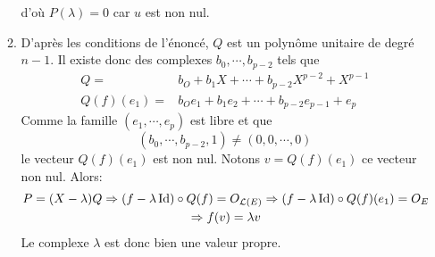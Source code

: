 \begin{enumerate}
\begin{enumerate}
d'où $P(\lambda)=0$ car $u$ est non nul.
\item D'après les conditions de l'énoncé, $Q$ est un polynôme unitaire de degré $n-1$. Il existe donc des complexes $b_0,\cdots, b_{p-2}$ tels que
\begin{align*}
 Q =& b_O + b_1 X + \cdots +b_{p-2}X^{p-2}+X^{p-1}\\
Q(f)(e_1) =& b_Oe_1 + b_1 e_2 + \cdots +b_{p-2}e_{p-1}+e_{p}
\end{align*}
Comme la famille $(e_1,\cdots,e_p)$ est libre et que 
\begin{displaymath}
 (b_0,\cdots, b_{p-2},1) \neq (0,0,\cdots,0)
\end{displaymath}
le vecteur $Q(f)(e_1)$ est non nul. Notons $v=Q(f)(e_1)$ ce vecteur non nul. Alors:
\begin{multline*}
 P=(X-\lambda)Q \Rightarrow (f-\lambda \operatorname{Id})\circ Q(f) =O_{\mathcal L(E)}
\Rightarrow (f-\lambda \operatorname{Id})\circ Q(f)(e_1) =O_E \\
\Rightarrow f(v)=\lambda v
\end{multline*}
Le complexe $\lambda$ est donc bien une valeur propre.
\end{enumerate}
\end{enumerate}

